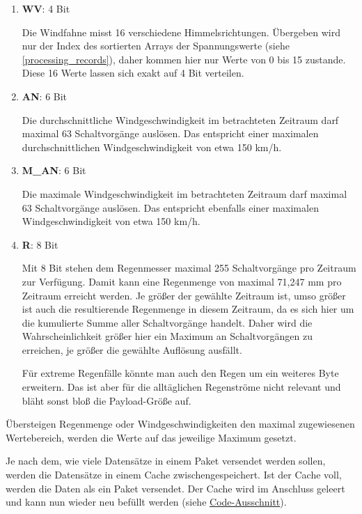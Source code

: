 \documentclass[12pt]{article}
\begin{document}
      \begin{enumerate}
        \item \textbf{WV}: 4 Bit
        
        Die Windfahne misst 16 verschiedene Himmelsrichtungen.
        Übergeben wird nur der Index des sortierten Arrays der Spannungswerte (siehe \underline{\ref{processing_records}}), daher kommen hier nur Werte von 0 bis 15 zustande.
        Diese 16 Werte lassen sich exakt auf 4 Bit verteilen.

        \item \textbf{AN}: 6 Bit
        
        Die durchschnittliche Windgeschwindigkeit im betrachteten Zeitraum darf maximal 63 Schaltvorgänge auslösen.
        Das entspricht einer maximalen durchschnittlichen Windgeschwindigkeit von etwa 150 km/h.

        \item \textbf{M\_AN}: 6 Bit
        
        Die maximale Windgeschwindigkeit im betrachteten Zeitraum darf maximal 63 Schaltvorgänge auslösen.
        Das entspricht ebenfalls einer maximalen Windgeschwindigkeit von etwa 150 km/h.

        \item \textbf{R}: 8 Bit
        
        Mit 8 Bit stehen dem Regenmesser maximal 255 Schaltvorgänge pro Zeitraum zur Verfügung.
        Damit kann eine Regenmenge von maximal 71,247 mm pro Zeitraum erreicht werden.
        Je größer der gewählte Zeitraum ist, umso größer ist auch die resultierende Regenmenge in diesem Zeitraum, da es sich hier um die kumulierte Summe aller Schaltvorgänge handelt.
        Daher wird die Wahrscheinlichkeit größer hier ein Maximum an Schaltvorgängen zu erreichen, je größer die gewählte Auflösung ausfällt.
        
        Für extreme Regenfälle könnte man auch den Regen um ein weiteres Byte erweitern.
        Das ist aber für die alltäglichen Regenströme nicht relevant und bläht sonst bloß die Payload-Größe auf.

        
      \end{enumerate}

      Übersteigen Regenmenge oder Windgeschwindigkeiten den maximal zugewiesenen Wertebereich, werden die Werte auf das jeweilige Maximum gesetzt.

      Je nach dem, wie viele Datensätze in einem Paket versendet werden sollen, werden die Datensätze in einem Cache zwischengespeichert.
      Ist der Cache voll, werden die Daten als ein Paket versendet.
      Der Cache wird im Anschluss geleert und kann nun wieder neu befüllt werden (siehe \href{https://github.com/HTWDD-RN/ps21-LoRa/blob/9c012bc1d41e960b6edf9e756e8948e387f28c83/src/lora_weather_station/lora_weather_station.ino#L154}{Code-Ausschnitt}).
\end{document}
